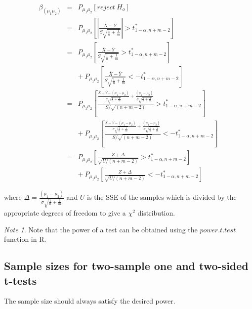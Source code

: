 \documentclass[12pt,a4paper]{article}
\theoremstyle{regla}
\theoremstyle{remark}
\newtheorem{notes}{Note}[section]
\theoremstyle{definition}
\theoremstyle{nonumberbreak}
\begin{document}
\begin{eqnarray*}
\beta_{(\mu_1\mu_2)}& = & P_{\mu_1\mu_2}\left[reject~H_o \right]\\
& = & P_{\mu_1\mu_2}\left[\left|\frac{\overline{X}-\overline{Y}}{S\sqrt{\frac{1}{n}+\frac{1}{m}}}\right| > t^\ast_{1-\alpha,n+m-2} \right]\\
& = & P_{\mu_1\mu_2}\left[\frac{\overline{X}-\overline{Y}}{S\sqrt{\frac{1}{n}+\frac{1}{m}}} > t^\ast_{1-\alpha,n+m-2} \right] \\
&& +\: P_{\mu_1\mu_2} \left[\frac{\overline{X}-\overline{Y}}{S\sqrt{\frac{1}{n}+\frac{1}{m}}} <-t^\ast_{1-\alpha,n+m-2} \right] \\
& = &  P_{\mu_1\mu_2}\left[\frac{\frac{\overline{X}-\overline{Y}-(\mu_1-\mu_2)}{\sigma\sqrt{\frac{1}{n}+\frac{1}{m}}}+\frac{(\mu_1-\mu_2)}{\sigma\sqrt{\frac{1}{n}+\frac{1}{m}}}}{S/\sqrt{(n+m-2)}} > t^\ast_{1-\alpha,n+m-2}\right] \\
&& +\:   P_{\mu_1\mu_2}\left[\frac{\frac{\overline{X}-\overline{Y}-(\mu_1-\mu_2)}{\sigma\sqrt{\frac{1}{n}+\frac{1}{m}}}+\frac{(\mu_1-\mu_2)}{\sigma\sqrt{\frac{1}{n}+\frac{1}{m}}}}{S/\sqrt{(n+m-2)}} < -t^\ast_{1-\alpha,n+m-2}\right]
\\
& = &  P_{\mu_1\mu_2}\left[ \frac{Z + \Delta}{\sqrt{U/(n+m-2)}} > t^\ast_{1-\alpha,n+m-2} \right]\\
&& +\: P_{\mu_1\mu_2}\left[ \frac{Z + \Delta}{\sqrt{U/(n+m-2)}} < -t^\ast_{1-\alpha,n+m-2} \right]
\end{eqnarray*}

where $\Delta = \frac{(\mu_1-\mu_2)}{\sigma\sqrt{\frac{1}{n}+\frac{1}{m}}} $ and 
$U$ is the SSE of the samples which is divided by the appropriate degrees of freedom to give a $\chi^2$ distribution.\\

\begin{notes}
Note that the power of a test can be obtained using the $power.t.test$ function in R.
\end{notes}

\subsection{Sample sizes for two-sample one and two-sided t-tests}
\begin{fbox}
\begin{minipage}{0.97\textwidth}
The sample size should always satisfy the desired power. 



\end{minipage}
\end{fbox}
\end{document}
